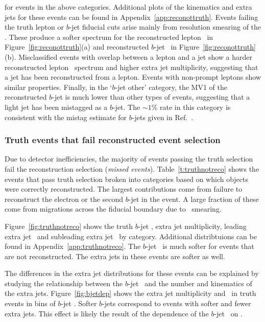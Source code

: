 for events in the above categories. Additional plots of the kinematics and extra jets for these events can be found in Appendix~\ref{app:reconottruth}. 
Events failing the truth lepton or $b$-jet fiducial cuts arise mainly from resolution smearing of the \pt.
These produce a softer spectrum 
for the reconstructed lepton \pt\ in Figure~\ref{fig:reconottruth}(a) and reconstructed $b$-jet \pt\ in Figure~\ref{fig:reconottruth}(b). 
Misclassified events with overlap between a lepton and a jet show a harder reconstructed lepton \pt\ spectrum and higher extra jet multiplicity, suggesting that a jet has been reconstructed from a lepton. Events with non-prompt leptons show similar properties. 
Finally, in the `$b$-jet other' category, the MV1 of the reconstructed $b$-jet is much lower than other types of events, 
suggesting that a light jet has been mistagged as a $b$-jet. The $\sim 1\%$ rate in this category is consistent with 
the mistag estimate for $b$-jets given in Ref.~\cite{btagmiscal}.

\subsubsection{Truth events that fail reconstructed event selection}
\label{ss:truthNotReco}
Due to detector inefficiencies, the majority of events passing the truth selection fail the reconstruction selection (\textit{missed events}). Table~\ref{t:truthnotreco} shows the events that pass truth selection broken into categories based on which objects were correctly reconstructed. The largest contributions come from failure to reconstruct the electron or the second $b$-jet in the event. A large fraction of these come from migrations across the fiducial boundary due to \pt\ smearing. 

Figure~\ref{fig:truthnotreco} shows the truth $b$-jet \pt, extra jet multiplicity, leading extra jet \pt\ and subleading extra 
jet \pt\ by category. Additional distribtuions can be found in Appendix~\ref{app:truthnotreco}. The $b$-jet \pt\ 
is much softer for events that are not reconstructed. The extra jets in these events are softer as well.

The differences in the extra jet distributions for these events can be explained by studying the relationship between the $b$-jet \pt\ 
and the number and kinematics of the extra jets. Figure~\ref{fig:bjetdep} shows the extra jet multiplicity and \pt\ in truth events in 
bins of $b$-jet \pt. Softer $b$-jets correspond to events with softer and fewer extra jets. This effect is likely the result of 
the dependence of the  $b$-jet \pt\ on \pttop. 

